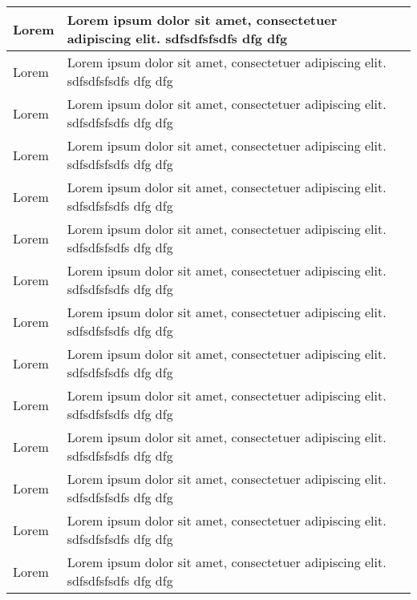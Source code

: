 \begin{longtable}{|>{\small\setlength\hsize{.5\hsize}}X|>{\small\setlength\hsize{1.5\hsize}}X|}
Lorem & Lorem ipsum dolor sit amet, consectetuer adipiscing elit. sdfsdfsfsdfs dfg dfg\\\hline
Lorem & Lorem ipsum dolor sit amet, consectetuer adipiscing elit. sdfsdfsfsdfs dfg dfg\\\hline
Lorem & Lorem ipsum dolor sit amet, consectetuer adipiscing elit. sdfsdfsfsdfs dfg dfg\\\hline
Lorem & Lorem ipsum dolor sit amet, consectetuer adipiscing elit. sdfsdfsfsdfs dfg dfg\\\hline
Lorem & Lorem ipsum dolor sit amet, consectetuer adipiscing elit. sdfsdfsfsdfs dfg dfg\\\hline
Lorem & Lorem ipsum dolor sit amet, consectetuer adipiscing elit. sdfsdfsfsdfs dfg dfg\\\hline
Lorem & Lorem ipsum dolor sit amet, consectetuer adipiscing elit. sdfsdfsfsdfs dfg dfg\\\hline
Lorem & Lorem ipsum dolor sit amet, consectetuer adipiscing elit. sdfsdfsfsdfs dfg dfg\\\hline
Lorem & Lorem ipsum dolor sit amet, consectetuer adipiscing elit. sdfsdfsfsdfs dfg dfg\\\hline
Lorem & Lorem ipsum dolor sit amet, consectetuer adipiscing elit. sdfsdfsfsdfs dfg dfg\\\hline
Lorem & Lorem ipsum dolor sit amet, consectetuer adipiscing elit. sdfsdfsfsdfs dfg dfg\\\hline
Lorem & Lorem ipsum dolor sit amet, consectetuer adipiscing elit. sdfsdfsfsdfs dfg dfg\\\hline
Lorem & Lorem ipsum dolor sit amet, consectetuer adipiscing elit. sdfsdfsfsdfs dfg dfg\\\hline
Lorem & Lorem ipsum dolor sit amet, consectetuer adipiscing elit. sdfsdfsfsdfs dfg dfg\\\hline
\end{longtable}
